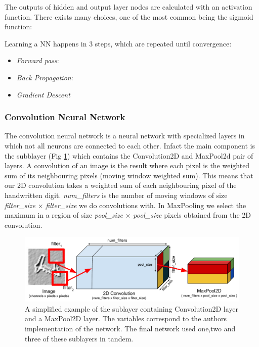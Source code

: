 \documentclass[conference]{IEEEtran}
\begin{document}
The outputs of hidden and output layer nodes are calculated with an activation function. There exists many choices, one of the most common being the sigmoid function:



Learning a NN happens in 3 steps, which are repeated until convergence:
\begin{itemize}
\item \emph{Forward pass}:
\item \emph{Back Propagation}:
\item \emph{Gradient Descent}
\end{itemize}

\subsubsection{Convolution Neural Network}
The convolution neural network \cite{LeCunn98} is a neural network with specialized layers in which not all neurons are connected to each other. Infact the main component is the subblayer (Fig \ref{convmaxlayer}) which contains the Convolution2D and MaxPool2d pair of layers. A convolution of an image is the result where each pixel is the weighted sum of its neighbouring pixels (moving window weighted sum). This means that our 2D convolution takes a weighted sum of each neighbouring pixel of the handwritten digit. \emph{num\_filters} is the number of moving windows of size \emph{filter\_size} $\times$ \emph{filter\_size} we do convolutions with. In MaxPooling we select the maximum in a region of size \emph{pool\_size} $\times$ \emph{pool\_size} pixels obtained from the 2D convolution.


\begin{figure}[h]

	\includegraphics[scale=0.40]{convnet_example.pdf}
	\caption{A simplified example of the sublayer containing Convolution2D layer and a MaxPool2D layer. The variables correspond to the authors implementation of the network. The final network used one,two and three of these sublayers in tandem.}
	\label{convmaxlayer}
\end{figure}
\end{document}
